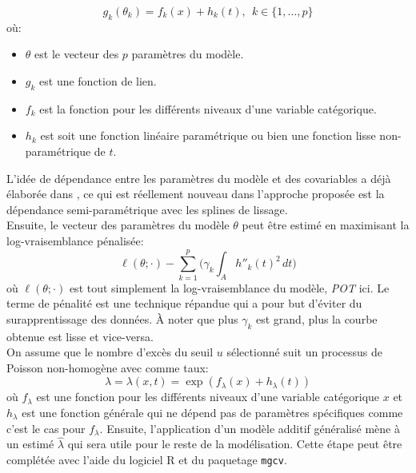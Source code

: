 \begin{equation}\label{eq:2.2.1}
g_k(\theta_k) = f_k(x) + h_k(t), \ \ k \in \{1, \dots, p \}
\end{equation}
où:
\begin{itemize}
\item $\theta$ est le vecteur des $p$ paramètres du modèle.
\item $g_k$ est une fonction de lien.
\item $f_k$ est la fonction pour les différents niveaux d'une variable catégorique.
\item $h_k$ est soit une fonction linéaire paramétrique ou bien une fonction lisse non-paramétrique de $t$.
\end{itemize}

 L'idée de dépendance entre les paramètres du modèle et des covariables a déjà élaborée dans \cite{coles2001introduction}, ce qui est réellement nouveau dans l'approche proposée est la dépendance semi-paramétrique avec les splines de lissage. \\
 
 Ensuite, le vecteur des paramètres du modèle $\theta$ peut être estimé en maximisant la log-vraisemblance pénalisée:
 \begin{equation}\label{eq:2.2.2}
 \ell(\theta; \cdot) - \sum_{k=1}^{p}\Big(\gamma_k \int_A h''_k(t)^2 \,dt\Big)
 \end{equation}
 où $ \ell(\theta; \cdot)$ est tout simplement la log-vraisemblance du modèle, \textit{POT} ici. Le terme de pénalité est une technique répandue qui a pour but d'éviter du surapprentissage des données. À noter que plus $\gamma_k$ est grand, plus la courbe obtenue est lisse et vice-versa. 
 \\
 
On assume que le nombre d'excès du seuil $u$ sélectionné suit un processus de Poisson non-homogène avec comme taux:
 \begin{equation}\label{eq:2.2.3}
 \lambda = \lambda(x, t) = \exp(f_\lambda(x) + h_\lambda(t))
  \end{equation}
  où $f_\lambda$ est une fonction pour les différents niveaux d'une variable catégorique $x$ et $h_\lambda$ est une fonction générale qui ne dépend pas de paramètres spécifiques comme c'est le cas pour $f_\lambda$. Ensuite, l'application d'un modèle additif généralisé mène à un estimé $\hat\lambda$ qui sera utile pour le reste de la modélisation. Cette étape peut être complétée avec l'aide du logiciel \textsf{R} et du paquetage \texttt{mgcv}.
  \\  
  
